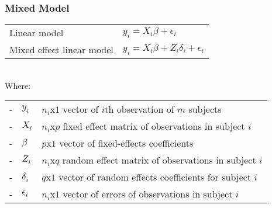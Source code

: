 \documentclass[xcolor=table]{beamer}
\begin{document}
\begin{frame}
	\frametitle{Mixed Model}
	\begin{tabular}{ll}
		\vspace{-0.75em}Linear model & $y_i = X_i \beta + \epsilon_i$ \\
		Mixed effect linear model & $y_i = X_i \beta + Z_i \delta_i + \epsilon_i$ \\
	\end{tabular}\\\vspace{0.5em}
	Where:\\
	\begin{tabular}{lll}
		-\vspace{-0.5em}&$y_i$ & $n_i$x$1$ vector of $i$th observation of $m$ subjects\\
		-\vspace{-0.5em}&$X_i$ & $n_i$x$p$ fixed effect matrix of observations in subject $i$\\
		-\vspace{-0.5em}&$\beta$ & $p$x$1$ vector of fixed-effects coefficients\\
		-\vspace{-0.5em}&$Z_i$ & $n_i$x$q$ random effect matrix of observations in subject $i$\\
		-\vspace{-0.5em}&$\delta_i$ & $q$x$1$ vector of random effects coefficients for subject $i$\\
		-\vspace{-0.5em}&$\epsilon_i$ & $n_i$x$1$ vector of errors of observations in subject $i$\\
	\end{tabular}
\end{frame}

\end{document}
